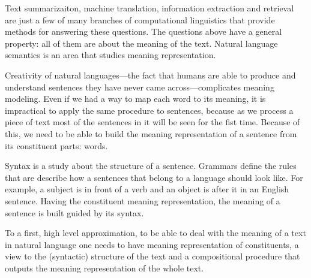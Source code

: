 Text summarizaiton, machine translation, information extraction and retrieval
are just a few of many branches of computational linguistics that provide
methods for answering these questions. The questions above have a general
property: all of them are about the meaning of the text. Natural language
semantics is an area that studies meaning representation.

Creativity of natural languages---the fact that humans are able to produce and
understand sentences they have never came across---complicates meaning
modeling. Even if we had a way to map each word to its meaning, it is
impractical to apply the same procedure to sentences, because as we process a
piece of text most of the sentences in it will be seen for the fist
time. Because of this, we need to be able to build the meaning representation of
a sentence from its constituent parts: words.

Syntax is a study about the structure of a sentence. Grammars define the rules
that are describe how a sentences that belong to a language should look
like. For example, a subject is in front of a verb and an object is after it in
an English sentence. Having the constituent meaning representation, the meaning
of a sentence is built guided by its syntax.

To a first, high level approximation, to be able to deal with the meaning of a
text in natural language one needs to have meaning representation of
constituents, a view to the (syntactic) structure of the text and a
compositional procedure that outputs the meaning representation of the whole
text.




